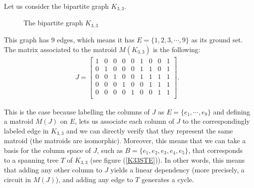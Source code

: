 \begin{exmp}
    Let us consider the bipartite graph $K_{3,3}$.
\begin{figure}[H]
\centering
{}
    \caption{The bipartite graph $K_{3,3}$}
    \label{fig:enter-label}
\end{figure}

This graph has $9$ edges, which means it has $E=\{1,2,3, \cdots, 9\} $ as its ground set. The matrix associated to the matroid $M(K_{3,3})$ is the following:
\begin{align*}
J = \begin{bmatrix}
    1 & 0 & 0 & 0 & 0 & 1 & 0 & 0 & 1\\
    0 & 1 & 0 & 0 & 0 & 1 & 1 & 0 & 1\\
    0 & 0 & 1 & 0 & 0 & 1 & 1 & 1 & 1\\
    0 & 0 & 0 & 1 & 0 & 0 & 1 & 1 & 1\\
    0 & 0 & 0 & 0 & 1 & 0 & 0 & 1 & 1\\
\end{bmatrix}.
\end{align*}

    This is the case because labelling the columns of $J$ as $E = \{e_1,\cdots, e_9\}$ and defining a matroid $M(J)$ on $E$, lets us associate each column of $J$ to the correspondingly labeled edge in $K_{3,3}$ and we can directly verify that they represent the same matroid (the matroids are isomorphic). Moreover, this means that we can take a basis for the column space of $J$, such as $B = \{e_1, e_2, e_3, e_4, e_5\}$, that corresponds to a spanning tree $T$ of $K_{3,3}$ (see figure (\ref{K33STE})). In other words, this means that adding any other column to $J$ yields a linear dependency (more precisely, a circuit in $M(J)$), and adding any edge to $T$ generates a cycle.


\end{exmp}
